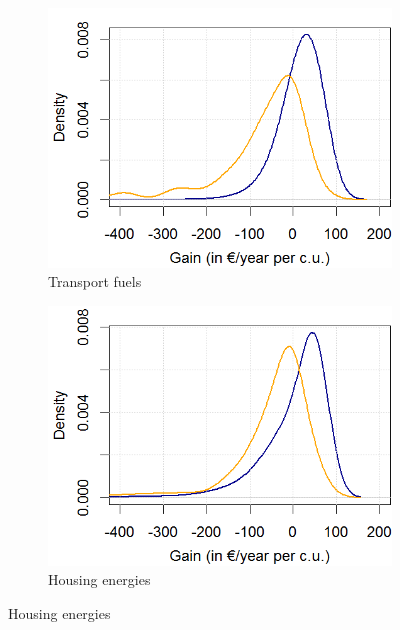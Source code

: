\documentclass[12pt]{article} %
\providecommand{\DIFdelbegin}{} %
\providecommand{\DIFaddbeginFL}{} %
\providecommand{\DIFaddendFL}{} %
\providecommand{\DIFdelendFL}{} %
\newcommand{\DIFscaledelfig}{0.5}
\newlength{\DIFdelgraphicswidth} %
\newlength{\DIFdelgraphicsheight} %
\newcommand{\DIFaddincludegraphics}[2][]{{\color{blue}\fbox{\DIFOincludegraphics[#1]{#2}}}} %
\newcommand{\DIFdelincludegraphics}[2][]{%
\sbox{\DIFdelgraphicsbox}{\DIFOincludegraphics[#1]{#2}}%
\settoboxwidth{\DIFdelgraphicswidth}{\DIFdelgraphicsbox} %
\settoboxtotalheight{\DIFdelgraphicsheight}{\DIFdelgraphicsbox} %
\scalebox{\DIFscaledelfig}{%
\parbox[b]{\DIFdelgraphicswidth}{\usebox{\DIFdelgraphicsbox}\\[-\baselineskip] \rule{\DIFdelgraphicswidth}{0em}}\llap{\resizebox{\DIFdelgraphicswidth}{\DIFdelgraphicsheight}{%
\setlength{\unitlength}{\DIFdelgraphicswidth}%
\begin{picture}(1,1)%
\thicklines\linethickness{2pt} %
{\color[rgb]{1,0,0}\put(0,0){\framebox(1,1){}}}%
{\color[rgb]{1,0,0}\put(0,0){\line( 1,1){1}}}%
{\color[rgb]{1,0,0}\put(0,1){\line(1,-1){1}}}%
\end{picture}%
}\hspace*{3pt}}} %
} %
\DeclareRobustCommand{\DIFdelbegin}{\DIFOdelbegin \let\includegraphics\DIFdelincludegraphics} %
\DeclareRobustCommand{\DIFaddbeginFL}{\DIFOaddbeginFL \let\includegraphics\DIFaddincludegraphics} %
\DeclareRobustCommand{\DIFaddendFL}{\DIFOaddendFL \let\includegraphics\DIFOincludegraphics} %
\DeclareRobustCommand{\DIFdelendFL}{\DIFOaddendFL \let\includegraphics\DIFOincludegraphics} %
\begin{document}
\DIFdelbegin %
\DIFdelendFL \DIFaddbeginFL \begin{figure}[!htbp]
\DIFaddendFL \hspace{-1.5cm}
\begin{subfigure}{.3\textwidth}
\centering
\includegraphics[width=0.28\paperwidth]{Images/pdf_transport_titled.png}
\caption{Transport fuels}
\end{subfigure}\hfill
\begin{subfigure}{.3\textwidth}
\centering
\includegraphics[width=0.28\paperwidth]{Images/pdf_housing_titled.png}
\caption{Housing energies} \end{subfigure}\hfill

\end{figure}
\end{document}
